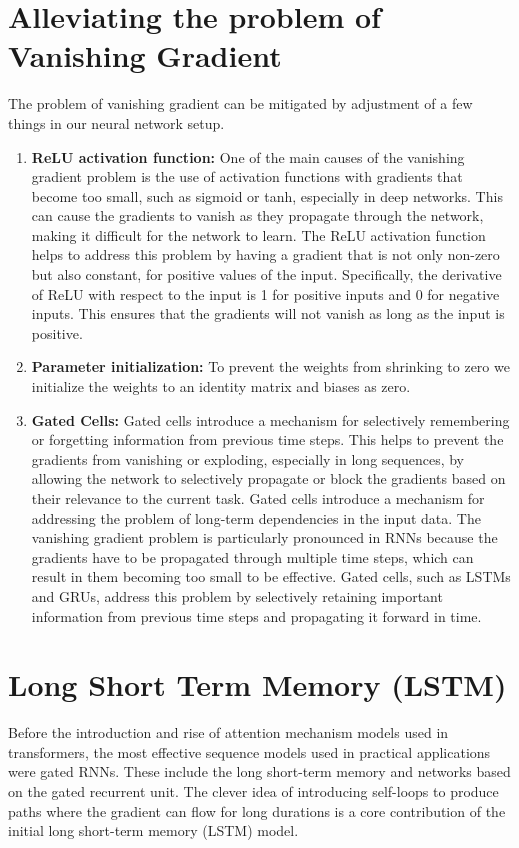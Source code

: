 \documentclass{report}
\begin{document}
\section{Alleviating the problem of Vanishing Gradient}
The problem of vanishing gradient can be mitigated by adjustment of a few things in our neural network setup.
\begin{enumerate}
	\item \textbf{ReLU activation function:} One of the main causes of the vanishing gradient problem is the use of activation functions with gradients that become too small, such as sigmoid or tanh, especially in deep networks. This can cause the gradients to vanish as they propagate through the network, making it difficult for the network to learn. The ReLU activation function helps to address this problem by having a gradient that is not only non-zero but also constant, for positive values of the input. Specifically, the derivative of ReLU with respect to the input is 1 for positive inputs and 0 for negative inputs. This ensures that the gradients will not vanish as long as the input is positive.
	\item \textbf{Parameter initialization:} To prevent the weights from shrinking to zero we initialize the weights to an identity matrix and biases as zero.
	\item \textbf{Gated Cells:} Gated cells introduce a mechanism for selectively remembering or forgetting information from previous time steps. This helps to prevent the gradients from vanishing or exploding, especially in long sequences, by allowing the network to selectively propagate or block the gradients based on their relevance to the current task. Gated cells introduce a mechanism for addressing the problem of long-term dependencies in the input data. The vanishing gradient problem is particularly pronounced in RNNs because the gradients have to be propagated through multiple time steps, which can result in them becoming too small to be effective. Gated cells, such as LSTMs and GRUs, address this problem by selectively retaining important information from previous time steps and propagating it forward in time.
\end{enumerate}

\section{Long Short Term Memory (LSTM)}
Before the introduction and rise of attention mechanism models used in transformers, the most effective sequence models used in practical applications were gated RNNs. These include the long short-term memory and networks based on the gated recurrent unit. The clever idea of introducing self-loops to produce paths where the gradient can flow for long durations is a core contribution of the initial long short-term memory (LSTM) model.
\end{document}
